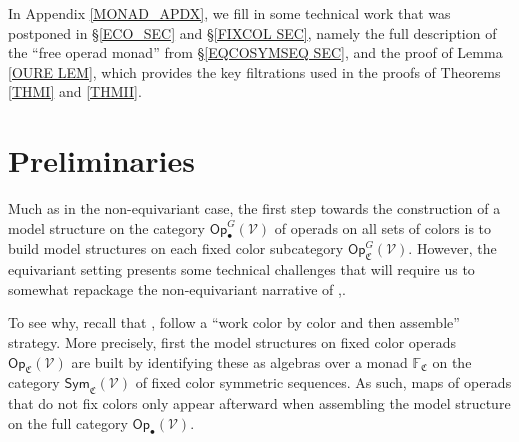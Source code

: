 \documentclass[a4paper,10pt
]{article}%
\numberwithin{equation}{section}
\numberwithin{figure}{section}
\theoremstyle{definition} %
\newcommand{\Op}{\mathsf{Op}}%
\newcommand{\V}{\ensuremath{\mathcal V}}
\newcommand{\1}{\ensuremath{\mathbbm 1}}%
\begin{document}


In Appendix \ref{MONAD_APDX},
we fill in some technical work that was postponed in \S \ref{ECO_SEC} and \S \ref{FIXCOL SEC},
namely the full description of the ``free operad monad''
from \S \ref{EQCOSYMSEQ SEC},
and the proof of Lemma \ref{OURE LEM},
which provides the key filtrations used in the proofs of
Theorems \ref{THMI} and \ref{THMII}.
 




\section{Preliminaries}\label{PRE SEC}


Much as in the non-equivariant case,
the first step towards the
construction of a model structure on the category $\Op_\bullet^G(\V)$ of operads on all sets of colors
is to build model structures on each 
fixed color subcategory $\Op_{\mathfrak C}^G(\V)$.
However, the equivariant setting presents some technical challenges that will 
require us to somewhat repackage the non-equivariant narrative of
\cite{CM13b},\cite{Cav}.



To see why, recall that \cite{CM13b},\cite{Cav}
follow a ``work color by color and then assemble'' strategy.
More precisely, first the model structures on fixed color operads 
$\mathsf{Op}_{\mathfrak{C}}(\V)$
are built by identifying these as algebras over a monad
$\mathbb{F}_{\mathfrak{C}}$
on the category $\mathsf{Sym}_{\mathfrak{C}}(\V)$
of fixed color symmetric sequences.
As such, maps of operads that do not fix colors
only appear afterward when assembling the model structure on the full category $\mathsf{Op}_{\bullet}(\V)$.
\end{document}
